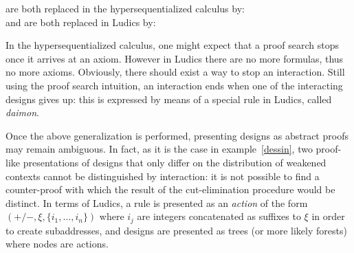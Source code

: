 \documentclass{LMCS}
\begin{document}
\begin{exa}
\noindent are both replaced in the hypersequentialized calculus by: $\quad$
                                  \\
and are both replaced in Ludics by: $\quad$
                     
                              
\label{loci}
\end{exa}
In the hypersequentialized calculus, one might expect that a proof search stops once it  arrives at an axiom. However in Ludics there are no more formulas, thus no more axioms. Obviously, there should exist a way to stop an interaction. Still using the proof search intuition, an interaction ends when one of the interacting designs gives up: this is expressed by means of a special rule in Ludics, called {\it daimon}.


Once the above generalization is performed, presenting designs as abstract proofs may remain ambiguous.
In fact, as it is the case in example~\ref{dessin}, two proof-like presentations of designs that only differ on the distribution of weakened contexts cannot be distinguished by interaction: it is not possible to find a counter-proof with which the result of the cut-elimination procedure would be distinct. 
In terms of Ludics, a rule is presented as an {\em action} of the form $(+/-,\xi,\{i_1,\dots,i_n\})$ where $i_j$ are integers concatenated as suffixes to $\xi$ in order to create subaddresses,
and designs are presented as trees (or more likely forests) where nodes are actions.
\end{document}
